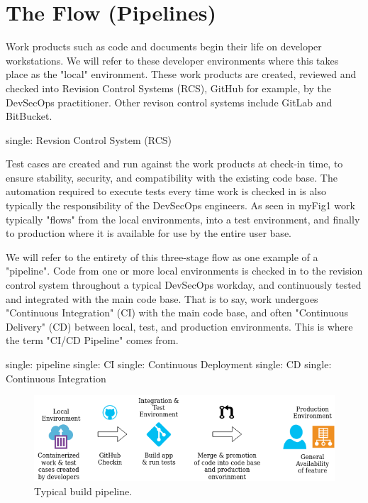 \section{The Flow (Pipelines)}

\justify
Work products such as code and documents begin their life on developer workstations. We will refer to these developer environments where this takes place as the "local" environment. These work products are created, reviewed and checked into Revision Control Systems (RCS), GitHub for example, by the DevSecOps practitioner. Other revison control systems include GitLab and BitBucket.

single: Revsion Control System (RCS)

\justify
Test cases are created and run against the work products at check-in time, to ensure stability, security, and compatibility with the existing code base. The automation required to execute tests every time work is checked in is also typically the responsibility of the DevSecOps engineers. As seen in {myFig1} work typically "flows" from the local environments, into a test environment, and finally to production where
it is available for use by the entire user base.

\justify
We will refer to the entirety of this three-stage flow as one example of
a "pipeline". Code from one or more local environments is checked in to
the revision control system throughout a typical DevSecOps workday, and
continuously tested and integrated with the main code base. That is to
say, work undergoes "Continuous Integration" (CI) with the main code base, and often "Continuous Delivery" (CD) between local, test, and production environments. This is where the term "CI/CD Pipeline" comes from.

single: pipeline single: CI single: Continuous Deployment single: CD
single: Continuous Integration

\begin{figure}
\centering
\includegraphics[scale=0.63]{../images/flow.png}
\caption{Typical build pipeline.}
\end{figure}

